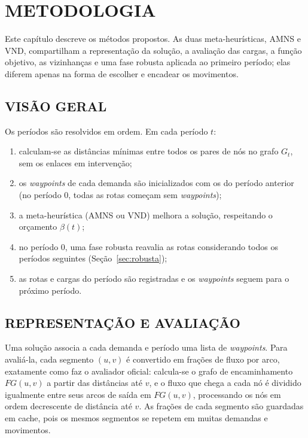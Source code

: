 \chapter{METODOLOGIA}
\label{cap:metodologia}

Este capítulo descreve os métodos propostos. As duas meta-heurísticas, AMNS e VND, compartilham a representação da solução, a avaliação das cargas, a função objetivo, as vizinhanças e uma fase robusta aplicada ao primeiro período; elas diferem apenas na forma de escolher e encadear os movimentos.

\section{\uppercase{Visão Geral}}

Os períodos são resolvidos em ordem. Em cada período $t$:
\begin{enumerate}
    \item calculam-se as distâncias mínimas entre todos os pares de nós no grafo $G_t$, sem os enlaces em intervenção;
    \item os \textit{waypoints} de cada demanda são inicializados com os do período anterior (no período 0, todas as rotas começam sem \textit{waypoints});
    \item a meta-heurística (AMNS ou VND) melhora a solução, respeitando o orçamento $\beta(t)$;
    \item no período 0, uma fase robusta reavalia as rotas considerando todos os períodos seguintes (Seção~\ref{sec:robusta});
    \item as rotas e cargas do período são registradas e os \textit{waypoints} seguem para o próximo período.
\end{enumerate}

\section{\uppercase{Representação e Avaliação}}

Uma solução associa a cada demanda e período uma lista de \textit{waypoints}. Para avaliá-la, cada segmento $(u, v)$ é convertido em frações de fluxo por arco, exatamente como faz o avaliador oficial: calcula-se o grafo de encaminhamento $FG(u, v)$ a partir das distâncias até $v$, e o fluxo que chega a cada nó é dividido igualmente entre seus arcos de saída em $FG(u, v)$, processando os nós em ordem decrescente de distância até $v$. As frações de cada segmento são guardadas em cache, pois os mesmos segmentos se repetem em muitas demandas e movimentos.

